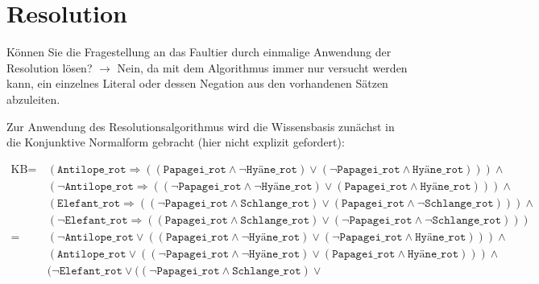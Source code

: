 \documentclass[a4paper,draft=false,oneside,12pt,ngerman]{scrreprt}
\begin{document}
\section{Resolution}
\label{sec:resolution}

Können Sie die Fragestellung an das Faultier durch einmalige Anwendung der
Resolution lösen? $\rightarrow$ Nein, da mit dem Algorithmus immer nur versucht
werden kann, ein einzelnes Literal oder dessen Negation aus den vorhandenen
Sätzen abzuleiten.

Zur Anwendung des Resolutionsalgorithmus wird die Wissensbasis zunächst in die
Konjunktive Normalform gebracht (hier nicht explizit gefordert):

\begin{align*}
    \text{KB} =\, &
            (\texttt{Antilope\_rot} \Rightarrow (
                (\texttt{Papagei\_rot} \land \neg \texttt{Hyäne\_rot}) \lor
                (\neg \texttt{Papagei\_rot} \land \texttt{Hyäne\_rot})
                )
            ) \land \\ &
            (\neg \texttt{Antilope\_rot} \Rightarrow (
                (\neg \texttt{Papagei\_rot} \land \neg\texttt{Hyäne\_rot}) \lor
                (\texttt{Papagei\_rot} \land \texttt{Hyäne\_rot})
                )
            ) \land \\ &
            (\texttt{Elefant\_rot} \Rightarrow (
                (\neg \texttt{Papagei\_rot} \land \texttt{Schlange\_rot}) \lor
                (\texttt{Papagei\_rot} \land \neg \texttt{Schlange\_rot})
                )
            ) \land \\ &
            (\neg \texttt{Elefant\_rot} \Rightarrow (
                (\texttt{Papagei\_rot} \land \texttt{Schlange\_rot}) \lor
                (\neg \texttt{Papagei\_rot} \land \neg \texttt{Schlange\_rot})
                )
            ) \\
        =\, & 
            (\neg \texttt{Antilope\_rot} \lor (
                (\texttt{Papagei\_rot} \land \neg \texttt{Hyäne\_rot}) \lor
                (\neg \texttt{Papagei\_rot} \land \texttt{Hyäne\_rot})
                )
            ) \land \\ &
            (\texttt{Antilope\_rot} \lor (
                (\neg \texttt{Papagei\_rot} \land \neg\texttt{Hyäne\_rot}) \lor
                (\texttt{Papagei\_rot} \land \texttt{Hyäne\_rot})
                )
            ) \land \\ &
            (\neg \texttt{Elefant\_rot} \lor (
                (\neg \texttt{Papagei\_rot} \land \texttt{Schlange\_rot}) \lor

\end{align*}
\end{document}
